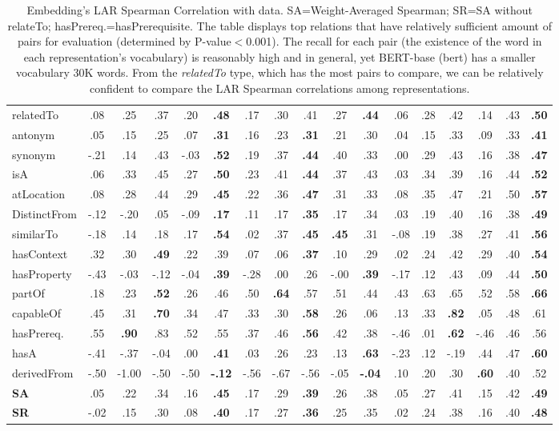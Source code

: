 \documentclass[letterpaper]{article} %
\begin{document}
\begin{table}[ht]
\begin{tabular}{@{}l|ccccc|ccccc|cccccc@{}}
relatedTo&.08&.25&.37&.20&\textbf{.48}&.17&.30&.41&.27&\textbf{.44}&.06&.28&.42&.14 & .43 & \textbf{.50}\\
antonym&.05&.15&.25&.07&\textbf{.31}&.16&.23&\textbf{.31}&.21&.30&.04&.15&.33 &.09&.33 & \textbf{.41}\\
synonym&-.21&.14&.43&-.03&\textbf{.52}&.19&.37&\textbf{.44}&.40&.33&.00&.29& .43 &.16&.38 & \textbf{.47}\\
isA&.06&.33&.45&.27&\textbf{.50}&.23&.41&\textbf{.44}&.37&.43&.03&.34&.39&.16&.44 & \textbf{.52}\\
atLocation&.08&.28&.44&.29&\textbf{.45}&.22&.36&\textbf{.47}&.31&.33&.08&.35&.47&.21&.50 & \textbf{.57}\\
DistinctFrom&-.12&-.20&.05&-.09&\textbf{.17}&.11&.17&\textbf{.35}&.17&.34&.03&.19& .40 &.16&.38 & \textbf{.49}\\
similarTo&-.18&.14&.18&.17&\textbf{.54}&.02&.37&\textbf{.45}&\textbf{.45}&.31&-.08&.19&.38&.27&.41 & \textbf{.56}\\
hasContext&.32&.30&\textbf{.49}&.22&.39&.07&.06&\textbf{.37}&.10&.29&.02&.24&.42&.29&.40 & \textbf{.54}\\
hasProperty&-.43&-.03&-.12&-.04&\textbf{.39}&-.28&.00&.26&-.00&\textbf{.39}&-.17&.12&.43&.09&.44 & \textbf{.50}\\
partOf&.18&.23&\textbf{.52}&.26&.46&.50&\textbf{.64}&.57&.51&.44&.43&.63& .65&.52&.58 &\textbf{.66}\\
capableOf&.45&.31&\textbf{.70}&.34&.47&.33&.30&\textbf{.58}&.26&.06&.13&.33&\textbf{.82}&.05&.48 & .61\\
hasPrereq.&.55&\textbf{.90}&.83&.52&.55&.37&.46&\textbf{.56}&.42&.38&-.46&.01&\textbf{.62}&-.46 &.46 & .56\\
hasA&-.41&-.37&-.04&.00&\textbf{.41}&.03&.26&.23&.13&\textbf{.63}&-.23&.12&-.19&.44&.47 & \textbf{.60}\\
derivedFrom&-.50&-1.00&-.50&-.50&\textbf{-.12}&-.56&-.67&-.56&-.05&\textbf{-.04}&.10&.20&.30&\textbf{.60}&.40 & .52\\
\hline
\textbf{SA} & .05 & .22 & .34 & .16 & \textbf{.45} & .17 & .29 & \textbf{.39} & .26 & .38 & .05 & .27 & .41 & .15 & .42 & \textbf{.49}\\
\hline
\textbf{SR} & -.02 & .15 & .30 & .08 & \textbf{.40} & .17 & .27 & \textbf{.36} & .25 & .35 & .02 & .24 & .38 & .16 & .40 & \textbf{.48}\\

\end{tabular}
\caption{Embedding's LAR Spearman Correlation with data. 
SA=Weight-Averaged Spearman; SR=SA without relateTo; hasPrereq.=hasPrerequisite. The table displays top relations that have relatively sufficient amount of pairs for evaluation (determined by P-value$<$0.001). The recall for each pair (the existence of the word in each representation's vocabulary) is reasonably high and in general, yet BERT-base (bert) has a smaller vocabulary 30K words. From the \textit{relatedTo} type, which has the most pairs to compare, we can be relatively confident to compare the LAR Spearman correlations among representations.
}


\end{table}
\end{document}
